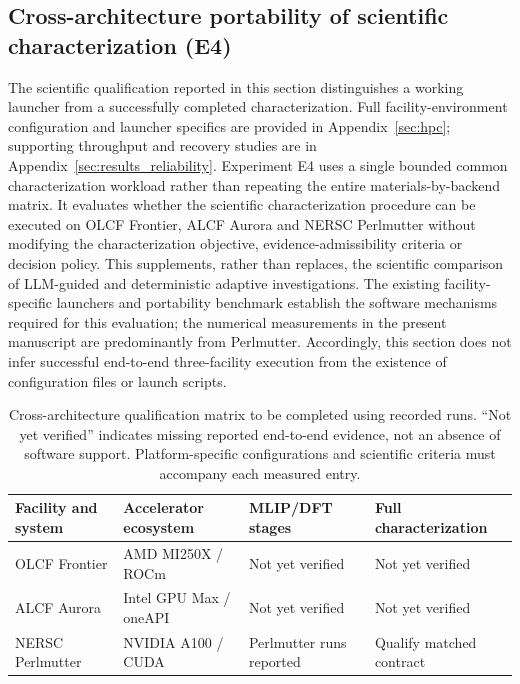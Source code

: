 \documentclass[11pt,a4paper]{article}
\begin{document}
\subsection{Cross-architecture portability of scientific characterization (E4)}
\noindent The scientific qualification reported in this section distinguishes a working launcher from a successfully completed characterization. Full facility-environment configuration and launcher specifics are provided in Appendix~\ref{sec:hpc}; supporting throughput and recovery studies are in Appendix~\ref{sec:results_reliability}.
\label{sec:results:crossplatform}
Experiment E4 uses a single bounded common characterization workload rather than repeating the entire materials-by-backend matrix. It evaluates whether the scientific characterization procedure can be executed on OLCF Frontier, ALCF Aurora and NERSC Perlmutter without modifying the characterization objective, evidence-admissibility criteria or decision policy. This supplements, rather than replaces, the scientific comparison of LLM-guided and deterministic adaptive investigations. The existing facility-specific launchers and portability benchmark establish the software mechanisms required for this evaluation; the numerical measurements in the present manuscript are predominantly from Perlmutter. Accordingly, this section does not infer successful end-to-end three-facility execution from the existence of configuration files or launch scripts.

\begin{table}[H]
\centering
\caption{Cross-architecture qualification matrix to be completed using recorded runs. ``Not yet verified'' indicates missing reported end-to-end evidence, not an absence of software support. Platform-specific configurations and scientific criteria must accompany each measured entry.}
\label{tab:cross-platform-qualification}
\small
\begin{tabular}{llll}
\hline
Facility and system & Accelerator ecosystem & MLIP/DFT stages & Full characterization \\
\hline
OLCF Frontier & AMD MI250X / ROCm & \textcolor{red!80!black}{Not yet verified} & \textcolor{red!80!black}{Not yet verified} \\
ALCF Aurora & Intel GPU Max / oneAPI & \textcolor{red!80!black}{Not yet verified} & \textcolor{red!80!black}{Not yet verified} \\
NERSC Perlmutter & NVIDIA A100 / CUDA & Perlmutter runs reported & \textcolor{red!80!black}{Qualify matched contract} \\
\hline
\end{tabular}
\end{table}
\end{document}
